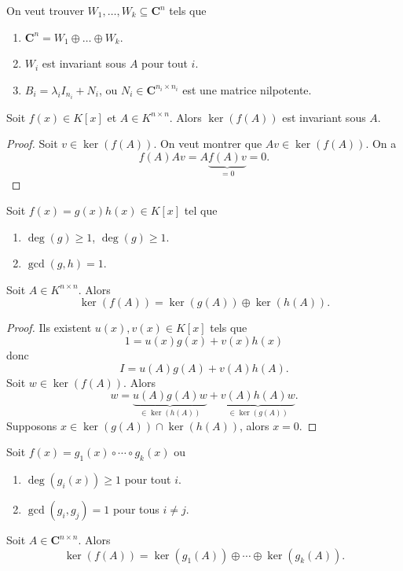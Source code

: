 On veut trouver $W_{1},\dots,W_{k}\subseteq \mathbf{C}^{n}$ tels que 
\begin{enumerate}
\item $\mathbf{C}^{n}=W_{1}\oplus\dots \oplus W_{k}$.
\item $W_{i}$ est invariant sous $A$ pour tout $i$.
\item $B_{i}=\lambda _{i}I_{n_{i}}+N_{i}$, ou $N_{i}\in \mathbf{C}^{n_{i}\times n_{i}}$ est une matrice nilpotente.
\end{enumerate}
\begin{lemma}
Soit $f(x)\in K[x]$ et $A\in K^{n\times n}$. Alors $\ker(f(A))$ est invariant sous $A$.
\end{lemma}
\begin{proof}
Soit $v\in \ker(f(A))$. On veut montrer que $Av\in \ker(f(A))$. On a
$$
f(A)Av=A\underbrace{ f(A)v }_{ =0 }=0.
$$
\end{proof}
\begin{lemma}\label{lem241}
Soit $f(x)=g(x)h(x)\in K[x]$ tel que
\begin{enumerate}
\item $\deg(g)\ge 1$, $\deg(g)\ge 1$.
\item $\gcd(g,h)=1$.
\end{enumerate}
Soit $A\in K^{n\times n}$. Alors
$$
\ker(f(A))=\ker(g(A))\oplus \ker(h(A)).
$$
\end{lemma}
\begin{proof}
Ils existent $u(x),v(x)\in K[x]$ tels que 
$$
1=u(x)g(x)+v(x)h(x)
$$
donc
$$
I=u(A)g(A)+v(A)h(A).
$$
Soit $w\in \ker(f(A))$. Alors
$$w=\underbrace{ u(A)g(A)w }_{ \in \ker(h(A)) }+\underbrace{ v(A)h(A)w }_{ \in \ker(g(A)) }.$$
Supposons $x \in \ker(g(A))\cap \ker(h(A))$, alors $x=0$.
\end{proof}
\begin{corollary}
Soit $f(x)=g_{1}(x)\circ\cdots\circ g_{k}(x)$ ou
\begin{enumerate}
\item $\deg(g_{i}(x))\ge 1$ pour tout $i$.
\item $\gcd(g_{i},g_{j})=1$ pour tous $i\neq j$.
\end{enumerate}
Soit $A\in \mathbf{C}^{n\times n}$. Alors
$$
\ker(f(A))=\ker(g_{1}(A))\oplus \cdots\oplus \ker(g_{k}(A)).
$$
\end{corollary}
